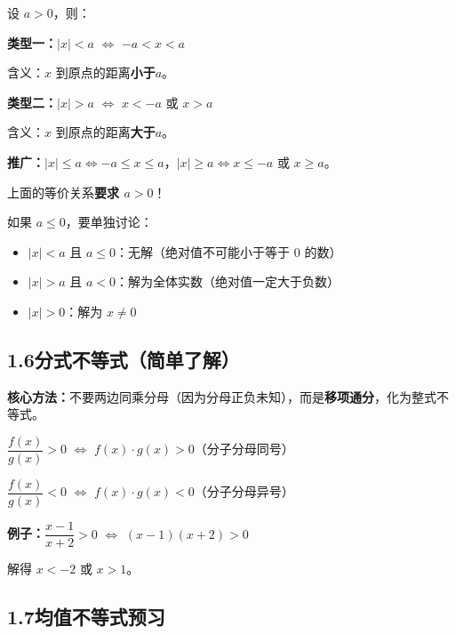 \documentclass[12pt, a4paper]{ctexart}
\begin{document}
\begin{knowledgebox}[绝对值不等式的两种基本类型]
设 $a > 0$，则：

\textbf{类型一：}$|x| < a$ \quad $\Longleftrightarrow$ \quad $-a < x < a$

\quad 含义：$x$ 到原点的距离\textbf{小于}$a$。

\textbf{类型二：}$|x| > a$ \quad $\Longleftrightarrow$ \quad $x < -a$ 或 $x > a$

\quad 含义：$x$ 到原点的距离\textbf{大于}$a$。

\medskip
\textbf{推广：}$|x| \leq a \Leftrightarrow -a \leq x \leq a$，\quad $|x| \geq a \Leftrightarrow x \leq -a$ 或 $x \geq a$。
\end{knowledgebox}

\begin{warnbox}[注意前提]
上面的等价关系\textbf{要求 $a > 0$}！

如果 $a \leq 0$，要单独讨论：
\begin{itemize}
  \item $|x| < a$ 且 $a \leq 0$：无解（绝对值不可能小于等于 $0$ 的数）
  \item $|x| > a$ 且 $a < 0$：解为全体实数（绝对值一定大于负数）
  \item $|x| > 0$：解为 $x \neq 0$
\end{itemize}
\end{warnbox}

\subsection*{1.6\quad 分式不等式（简单了解）}

\begin{knowledgebox}[分式不等式的基本解法]
\textbf{核心方法：}不要两边同乘分母（因为分母正负未知），而是\textbf{移项通分}，化为整式不等式。

\medskip
$\dfrac{f(x)}{g(x)} > 0$ \quad $\Longleftrightarrow$ \quad $f(x) \cdot g(x) > 0$（分子分母同号）

$\dfrac{f(x)}{g(x)} < 0$ \quad $\Longleftrightarrow$ \quad $f(x) \cdot g(x) < 0$（分子分母异号）

\medskip
\textbf{例子：}$\dfrac{x-1}{x+2} > 0$ \quad $\Longleftrightarrow$ \quad $(x-1)(x+2) > 0$

解得 $x < -2$ 或 $x > 1$。
\end{knowledgebox}

\subsection*{1.7\quad 均值不等式预习}
\end{document}
